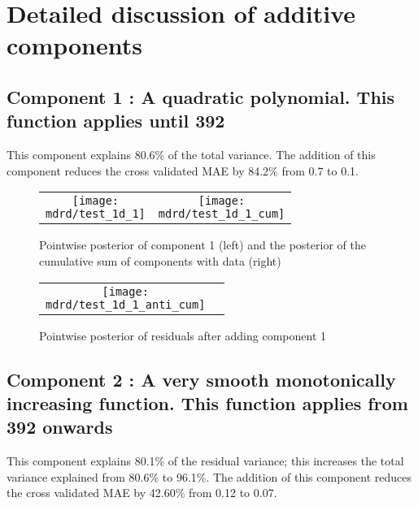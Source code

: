 \documentclass{article} %
\begin{document}
\section{Detailed discussion of additive components}
\label{sec:discussion}

\subsection{Component 1 : A quadratic polynomial. This function applies until  392}



This component explains 80.6\% of the total variance.
The addition of this component reduces the cross validated MAE by 84.2\% from 0.7 to 0.1.


\begin{figure}[H]
\newcommand{\wmgd}{0.5\columnwidth}
\newcommand{\hmgd}{3.0cm}
\newcommand{\mdrd}{test_1d}
\newcommand{\mbm}{\hspace{-0.3cm}}
\begin{tabular}{cc}
\mbm \texttt{[image: \\mdrd/test\_1d\_1]} & \texttt{[image: \\mdrd/test\_1d\_1\_cum]}
\end{tabular}
\caption{Pointwise posterior of component 1 (left) and the posterior of the cumulative sum of components with data (right)}
\label{fig:comp1}
\end{figure}

\begin{figure}[H]
\newcommand{\wmgd}{0.5\columnwidth}
\newcommand{\hmgd}{3.0cm}
\newcommand{\mdrd}{test_1d}
\newcommand{\mbm}{\hspace{-0.3cm}}
\begin{tabular}{cc}
\mbm \texttt{[image: \\mdrd/test\_1d\_1\_anti\_cum]}
\end{tabular}
\caption{Pointwise posterior of residuals after adding component 1}
\label{fig:comp1}
\end{figure}

\subsection{Component 2 : A very smooth monotonically increasing function. This function applies from  392 onwards}



This component explains 80.1\% of the residual variance; this increases the total variance explained from 80.6\% to 96.1\%.
The addition of this component reduces the cross validated MAE by 42.60\% from 0.12 to 0.07.
\end{document}

